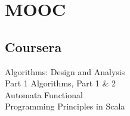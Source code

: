 \documentclass[a4paper]{curricula-vitae}
\begin{document}



\begin{minipage}[t]{0.33\textwidth} %







\section{MOOC}

\subsection{Coursera}
Algorithms: Design and Analysis \\
Part 1 \textbullet{} Algorithms, Part 1 \& 2 \\ 
Automata \textbullet{} Functional \\
Programming Principles in Scala


\end{minipage}
\end{document}
